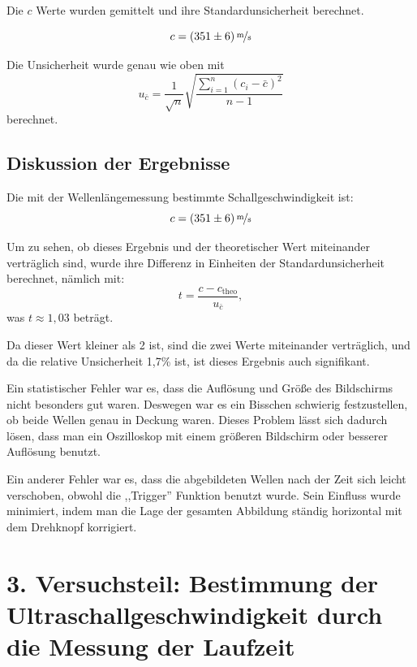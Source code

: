 \documentclass[11pt,a4paper]{article}
\begin{document}
Die $c$ Werte wurden gemittelt und ihre Standardunsicherheit berechnet. 

$$ c = (351 \pm 6)\,\nicefrac{\mathrm{m}}{\mathrm{s}}$$

Die Unsicherheit wurde genau wie oben mit
$$u_{\bar{c}} = \frac{1}{\sqrt{n}} \sqrt{\frac{\sum_{i=1}^{n}(c_i-\bar{c})^2}{n-1}}$$
berechnet. 




\subsection{Diskussion der Ergebnisse}


Die mit der Wellenlängemessung bestimmte Schallgeschwindigkeit ist:
$$ c = (351 \pm 6)\,\nicefrac{\mathrm{m}}{\mathrm{s}}$$

Um zu sehen, ob dieses Ergebnis und der theoretischer Wert miteinander verträglich sind, wurde ihre Differenz in Einheiten der Standardunsicherheit berechnet, nämlich mit:
$$ t = \frac{c - c_\textrm{theo}}{u_{\bar{c}}}, $$
 was $t \approx 1,03 $ beträgt. 
	
Da dieser Wert kleiner als 2 ist, sind die zwei Werte miteinander verträglich, und da die relative Unsicherheit 1,7\% ist, ist dieses Ergebnis auch signifikant. 

Ein statistischer Fehler war es, dass die Auflösung und Größe des Bildschirms nicht besonders gut waren. Deswegen war es ein Bisschen schwierig festzustellen, ob beide Wellen genau in Deckung waren. Dieses Problem lässt sich dadurch lösen, dass man ein Oszilloskop mit einem größeren Bildschirm oder besserer Auflösung benutzt. 

Ein anderer Fehler war es, dass die abgebildeten Wellen nach der Zeit sich leicht verschoben, obwohl die ,,Trigger'' Funktion benutzt wurde. Sein Einfluss wurde minimiert, indem man die Lage der gesamten Abbildung ständig horizontal mit dem Drehknopf korrigiert. 





\section{3. Versuchsteil: Bestimmung der Ultraschallgeschwindigkeit durch die Messung der Laufzeit}
\end{document}
